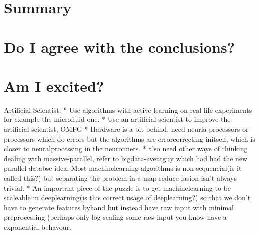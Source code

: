 \documentclass{article}
\begin{document}

\section{Summary} %

\section{Do I agree with the conclusions?}

\section{Am I excited?}

Artificial Scientist: 
* Use algorithms with active learning on real life experiments for example the
microfluid one.
* Use an artificial scientist to improve the artificial scientist, OMFG
* Hardware is a bit  behind, need neurla processors or processors which do
errors but the algorithms are errorcorrecting initself, which is closer to
neuralprocessing in the neuronnets.
* also need other ways of thinking dealing with massive-parallel, refer to
bigdata-eventguy which had had the new parallel-databse idea. Most
machinelearning algorithms is non-sequencial(is it called this?) but separating
the problem in a map-reduce fasion isn't always trivial.
* An important piece of the puzzle is to get machinelearning to be scaleable in
deeplearning(is this correct usage of deeplearning?) so that we don't have to
generate features byhand but instead have raw input with minimal preprocessing
(perhaps only log-scaling some raw input you know have a exponential behavour.
\end{document}
